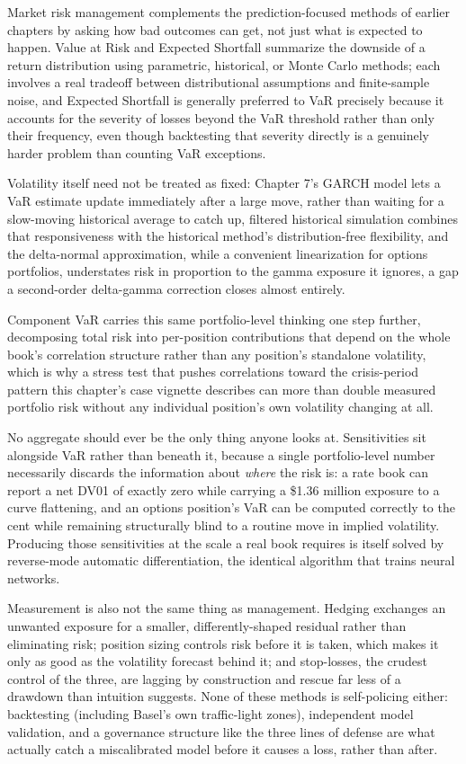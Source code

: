 \documentclass[../ai_in_finance]{subfiles}
\begin{document}
Market risk management complements the prediction-focused methods of earlier chapters by asking how bad outcomes can get, not just what is expected to happen. Value at Risk and Expected Shortfall summarize the downside of a return distribution using parametric, historical, or Monte Carlo methods; each involves a real tradeoff between distributional assumptions and finite-sample noise, and Expected Shortfall is generally preferred to VaR precisely because it accounts for the severity of losses beyond the VaR threshold rather than only their frequency, even though backtesting that severity directly is a genuinely harder problem than counting VaR exceptions.

Volatility itself need not be treated as fixed: Chapter 7's GARCH model lets a VaR estimate update immediately after a large move, rather than waiting for a slow-moving historical average to catch up, filtered historical simulation combines that responsiveness with the historical method's distribution-free flexibility, and the delta-normal approximation, while a convenient linearization for options portfolios, understates risk in proportion to the gamma exposure it ignores, a gap a second-order delta-gamma correction closes almost entirely.

Component VaR carries this same portfolio-level thinking one step further, decomposing total risk into per-position contributions that depend on the whole book's correlation structure rather than any position's standalone volatility, which is why a stress test that pushes correlations toward the crisis-period pattern this chapter's case vignette describes can more than double measured portfolio risk without any individual position's own volatility changing at all.

No aggregate should ever be the only thing anyone looks at. Sensitivities sit alongside VaR rather than beneath it, because a single portfolio-level number necessarily discards the information about \emph{where} the risk is: a rate book can report a net DV01 of exactly zero while carrying a \$1.36 million exposure to a curve flattening, and an options position's VaR can be computed correctly to the cent while remaining structurally blind to a routine move in implied volatility. Producing those sensitivities at the scale a real book requires is itself solved by reverse-mode automatic differentiation, the identical algorithm that trains neural networks.

Measurement is also not the same thing as management. Hedging exchanges an unwanted exposure for a smaller, differently-shaped residual rather than eliminating risk; position sizing controls risk before it is taken, which makes it only as good as the volatility forecast behind it; and stop-losses, the crudest control of the three, are lagging by construction and rescue far less of a drawdown than intuition suggests. None of these methods is self-policing either: backtesting (including Basel's own traffic-light zones), independent model validation, and a governance structure like the three lines of defense are what actually catch a miscalibrated model before it causes a loss, rather than after.
\end{document}

